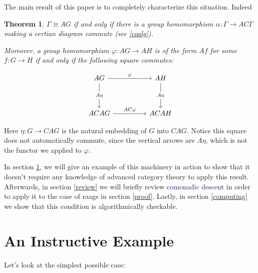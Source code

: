 \documentclass[12pt]{article}
\newtheorem{thm}{Theorem}
\theoremstyle{definition}
\theoremstyle{theorem}
\newcommand*{\important}[1]{\textcolor{MidnightBlue}{#1}}
\begin{document}
    The main result of this paper is to completely characterize this situation.
    Indeed

    \begin{thm}
        $\Gamma \cong AG$ if and only if there is a group homomorphism 
        $\alpha : \Gamma \to AC\Gamma$ making a certian diagram 
        commute (see \ref{coalg}).

        Moreover, a group homomorphism $\varphi : AG \to AH$ is of the form
        $Af$ for some $f : G \to H$ if and only if the following square commutes:

        \[
            \begin{tikzcd}
            AG && AH \\
            \\
            ACAG && ACAH
            \arrow["\varphi", from=1-1, to=1-3]
            \arrow["AC\varphi", from=3-1, to=3-3]
            \arrow["{A \eta}"{description}, from=1-1, to=3-1]
            \arrow["A\eta"{description}, from=1-3, to=3-3]
            \end{tikzcd}
        \]
    \end{thm}

    Here $\eta : G \to CAG$ is the natural embedding of $G$ into $CAG$.
    Notice this square does not automatically commute, since the vertical
    arrows are $A \eta$, which is not the functor we applied to $\varphi$.

    In section \ref{eg}, we will give an example of this machinery in action
    to show that it doesn't require any knowledge of advanced category theory
    to apply this result. Afterwards, in section \ref{review} 
    we will briefly review \important{comonadic descent} in order to apply it
    to the case of raags in section \ref{proof}. Lastly, in section \ref{computing}
    we show that this condition is algorithmically checkable. 




\section{An Instructive Example}
\label{eg}

Let's look at the simplest possible case:


\end{document}
